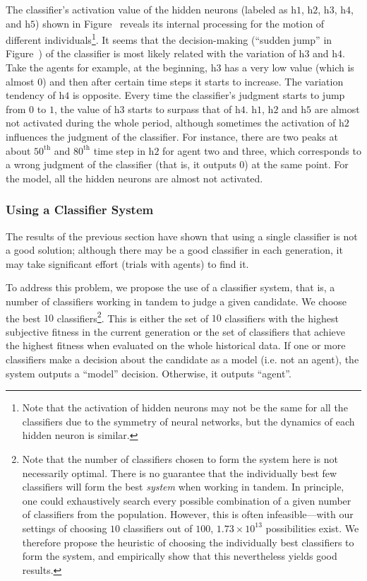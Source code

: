 The classifier's activation value of the hidden neurons (labeled as $\textrm{h}1$, $\textrm{h}2$, $\textrm{h}3$, $\textrm{h}4$, and $\textrm{h}5$) shown in Figure~ reveals its internal processing for the motion of different individuals\footnote{Note that the activation of hidden neurons may not be the same for all the classifiers due to the symmetry of neural networks, but the dynamics of each hidden neuron is similar.}. It seems that the decision-making (``sudden jump'' in Figure~) of the classifier is most likely related with the variation of $\textrm{h}3$ and $\textrm{h}4$. Take the agents for example, at the beginning, $\textrm{h}3$ has a very low value (which is almost $0$) and then after certain time steps it starts to increase. The variation tendency of $\textrm{h}4$ is opposite.  Every time the classifier's judgment starts to jump from $0$ to $1$, the value of $\textrm{h}3$ starts to surpass that of $\textrm{h}4$. $\textrm{h}1$, $\textrm{h}2$ and $\textrm{h}5$ are almost not activated during the whole period, although sometimes the activation of $\textrm{h}2$ influences the judgment of the classifier. For instance, there are two peaks at about $50^\textrm{th}$ and $80^\textrm{th}$ time step in $\textrm{h}2$ for agent two and three, which corresponds to a wrong judgment of the classifier (that is, it outputs $0$) at the same point. For the model, all the hidden neurons are almost not activated.


\subsubsection{Using a Classifier System}

The results of the previous section have shown that using a single classifier is not a good solution; although there may be a good classifier in each generation, it may take significant effort (trials with agents) to find it.

To address this problem, we propose the use of a classifier system, that is, a number of classifiers working in tandem to judge a given candidate. We choose the best $10$ classifiers\footnote{Note that the number of classifiers chosen to form the system here is not necessarily optimal. There is no guarantee that the individually best few classifiers will form the best \emph{system} when working in tandem. In principle, one could exhaustively search every possible combination of a given number of classifiers from the population. However, this is often infeasible---with our settings of choosing $10$ classifiers out of $100$, $1.73\times 10^{13}$ possibilities exist. We therefore propose the heuristic of choosing the individually best classifiers to form the system, and empirically show that this nevertheless yields good results.}. This is either the set of $10$ classifiers with the highest subjective fitness in the current generation or the set of classifiers that achieve the highest fitness when evaluated on the whole historical data. If one or more classifiers make a decision about the candidate as a model (i.e. not an agent), the system outputs a ``model'' decision. Otherwise, it outputs ``agent''.

